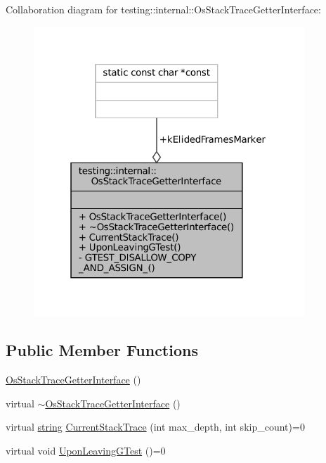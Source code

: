 Collaboration diagram for testing\+:\+:internal\+:\+:Os\+Stack\+Trace\+Getter\+Interface\+:
\nopagebreak
\begin{figure}[H]
\begin{center}
\leavevmode
\includegraphics[width=289pt]{classtesting_1_1internal_1_1OsStackTraceGetterInterface__coll__graph}
\end{center}
\end{figure}
\subsection*{Public Member Functions}
\begin{DoxyCompactItemize}
\item 
\hyperlink{classtesting_1_1internal_1_1OsStackTraceGetterInterface_afbe9eb0ca8775fbb98ff0720011b6708}{Os\+Stack\+Trace\+Getter\+Interface} ()
\item 
virtual \hyperlink{classtesting_1_1internal_1_1OsStackTraceGetterInterface_a193f4a1de4af9b78010c659912df5a15}{$\sim$\+Os\+Stack\+Trace\+Getter\+Interface} ()
\item 
virtual \hyperlink{namespacetesting_1_1internal_a8e8ff5b11e64078831112677156cb111}{string} \hyperlink{classtesting_1_1internal_1_1OsStackTraceGetterInterface_a6965eadb9b340808718fab9f1475c49a}{Current\+Stack\+Trace} (int max\+\_\+depth, int skip\+\_\+count)=0
\item 
virtual void \hyperlink{classtesting_1_1internal_1_1OsStackTraceGetterInterface_a791bd120428b5a53d5eeba1b27296a39}{Upon\+Leaving\+G\+Test} ()=0
\end{DoxyCompactItemize}
